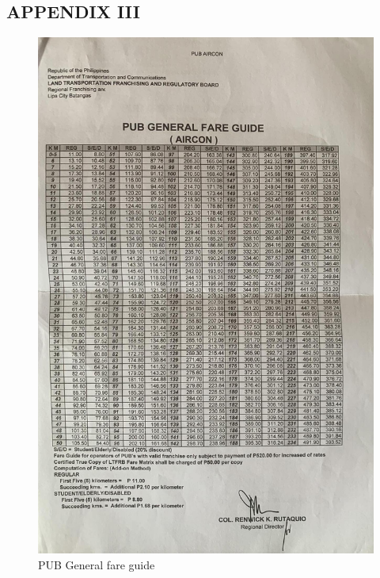 \documentclass{icsthesis}
\begin{document}
\begin{mainmatter}
\section{APPENDIX III}
\begin{figure}[!h]
    \centering
        \includegraphics[scale=0.25]{./figures/ltfrb/pub.jpeg}
    \caption{PUB General fare guide}
\end{figure}


\end{mainmatter}
\end{document}
